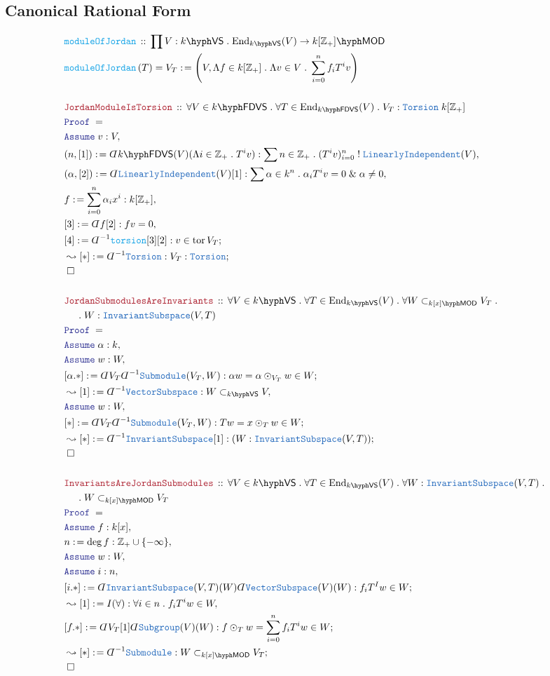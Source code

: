 \documentclass[12pt]{scrartcl}%
\newcommand{\TYPE}[1]{\textcolor{NavyBlue}{\mathtt{#1}}}%
\newcommand{\FUNC}[1]{\textcolor{Cerulean}{\mathtt{#1}}}%
\newcommand{\LOGIC}[1]{\textcolor{Blue}{\mathtt{#1}}}%
\newcommand{\THM}[1]{\textcolor{Maroon}{\mathtt{#1}}}%
\renewcommand{\.}{\; . \;} %
\newcommand{\de}{: \kern 0.1pc =} %
\newcommand{\IsNot}{\; ! \;} %
\newcommand{\Act}[1]{\left( #1 \right)} %
\newcommand{\Theorem}[2]{& \THM{#1} \, :: \, #2 \\ & \Proof = \\ } %
\newcommand{\DeclareFunc}[2]{& \FUNC{#1} \, :: \, #2 \\}%
\newcommand{\DefineNamedFunc}[4]{&  \FUNC{#1}\Act{#2} = #3 \de #4 \\}%
\newcommand{\NewLine}{\\ & \kern 1pc}%
\newcommand{\Page}[1]{ \begin{align*} #1 \end{align*}  }%
\newcommand{ \bd }{ \ByDef }%
\renewcommand{\And}{\; \& \;}%
\newcommand{\Int}{\mathbb{Z}}%
\newcommand{\End}{\mathrm{End}}%
\newcommand{\Say}[3]{& #1 \de #2 : #3, \\} %
\newcommand{\Conclude}[3]{& #1 \de #2 : #3; \\}%
\newcommand{\Derive}[3]{& \leadsto #1 \de #2 : #3, \\} %
\newcommand{\DeriveConclude}[3]{& \leadsto #1 \de #2 : #3 ; \\} %
\newcommand{\Assume}[2]{& \LOGIC{Assume} \; #1 : #2, \\} %
\newcommand{\QED}{\; \square} %
\newcommand{\EndProof}{& \QED \\} %
\newcommand{\ByDef}{\rotatebox[origin=c]{-180}{$D$}}%
\newcommand{\Proof}{\LOGIC{Proof} \; } %
\DeclareMathOperator{\tor}{tor} %
\newcommand{\submod}[1]{\subset_{\LMOD{#1}}}%
\newcommand{\subvec}[1]{\subset_{\VS{#1}}}%
\newcommand{\LI}{\TYPE{LinearlyIndependent}}
\newcommand{\IS}{\TYPE{InvariantSubspace}}
\newcommand{\VS}[1]{#1\hyph\mathsf{VS}} %
\newcommand{\FDVS}[1]{#1\hyph\mathsf{FDVS}} %
\newcommand{\LMOD}[1]{#1\hyph\mathsf{MOD}} %
\begin{document}
\subsection{Canonical Rational Form}
\Page{	
	\DeclareFunc{moduleOfJordan}{\prod V : \VS{k} \. \End_{\VS{k}}(V) \to \LMOD{k[\Int_+]}}
	\DefineNamedFunc{moduleOfJordan}{T}{V_T}{\left(V,\Lambda f \in k[\Int_+] \. \Lambda v \in V \. \sum_{i = 0}^n f_iT^i v\right)}
	\\
	\Theorem{JordanModuleIsTorsion}{\forall V \in \FDVS{k} \. \forall T \in \End_{\FDVS{k}}(V) \.  V_T : \TYPE{Torsion}\;k[\Int_+]}
	\Assume{v}{V}
	\Say{(n,[1])}{\bd \FDVS{k}(V)(\Lambda i \in \Int_+ \. T^iv)}{ \sum n \in \Int_+ \.(T^i v)^n_{i=0} \IsNot \LI(V) }
	\Say{(\alpha,[2])}{\bd \LI(V)[1]}{\sum \alpha \in k^n \. \alpha_i T^iv = 0 \And \alpha \neq 0}
	\Say{f}{\sum^n_{i=0}\alpha_ix^i}{k[\Int_+]}
	\Say{[3]}{\bd f [2]}{fv = 0}
	\Conclude{[4]}{\bd^{-1}\FUNC{torsion}[3][2]}{v \in \tor V_T}
	\DeriveConclude{[*]}{\bd^{-1}\TYPE{Torsion}}{V_T : \TYPE{Torsion}}
	\EndProof
	\\
	\Theorem{JordanSubmodulesAreInvariants}{\forall V \in \VS{k} \. \forall T \in \End_{\VS{k}}(V) \. \forall W \submod{k[x]} V_T \. \NewLine \. W : \IS(V,T)}
	\Assume{\alpha}{k}
	\Assume{w}{W}
	\Conclude{[\alpha.*]}{\bd V_T\bd^{-1}\TYPE{Submodule}(V_T,W)}{  \alpha w = \alpha \odot_{V_T} w \in W   }
	\Derive{[1]}{\bd^{-1}\TYPE{VectorSubspace}}{W \subvec{k} V }
	\Assume{w}{W}
	\Conclude{[*]}{\bd V_T \bd^{-1}\TYPE{Submodule}(V_T,W)}{Tw = x \odot_T w \in W}
	\DeriveConclude{[*]}{\bd^{-1}\IS[1]}{(W : \IS(V,T))}
	\EndProof
	\\
	\Theorem{InvariantsAreJordanSubmodules}{\forall V \in \VS{k} \. \forall T \in \End_{\VS{k}}(V) \. \forall  W : \IS(V,T) \. \NewLine \. W  \submod{k[x]} V_T}
	\Assume{f}{k[x]}
	\Say{n}{\deg f}{\Int_+ \cup \{-\infty\}}
	\Assume{w}{W}
	\Assume{i}{n}
	\Conclude{[i.*]}{\bd \IS(V,T)(W)\bd \TYPE{VectorSubspace}(V)(W)}{f_iT^Iw \in W}
	\Derive{[1]}{I(\forall)}{\forall i \in n \. f_i T^iw \in W}
	\Conclude{[f.*]}{\bd V_T [1] \bd \TYPE{Subgroup}(V)(W)}{f \odot_T w = \sum^n_{i=0} f_iT^iw \in W }
	\DeriveConclude{[*]}{\bd^{-1}\TYPE{Submodule}}{W \submod{k[x]} V_T}
	\EndProof
}
\end{document}
